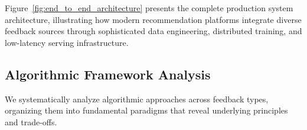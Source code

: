\begin{figure*}[ht]
\caption{Complete end-to-end production architecture for implicit-explicit hybrid recommender systems. The diagram illustrates the full data flow from multiple sources (web logs, mobile events, ratings, reviews, social signals) through real-time stream and batch processing pipelines, feature engineering and storage, distributed model training (matrix factorization, deep learning, graph neural networks, ensemble methods, online learning), model registry and serving infrastructure, prediction and ranking engines, API layer, and user interface. The red dashed line shows the critical feedback loop that captures new user interactions to continuously improve the system. Cyan components represent monitoring, A/B testing, and metrics infrastructure for production system health and performance evaluation.}
\label{fig:end_to_end_architecture}
\end{figure*}

Figure~\ref{fig:end_to_end_architecture} presents the complete production system architecture, illustrating how modern recommendation platforms integrate diverse feedback sources through sophisticated data engineering, distributed training, and low-latency serving infrastructure.

\subsection{Algorithmic Framework Analysis}

We systematically analyze algorithmic approaches across feedback types, organizing them into fundamental paradigms that reveal underlying principles and trade-offs.

